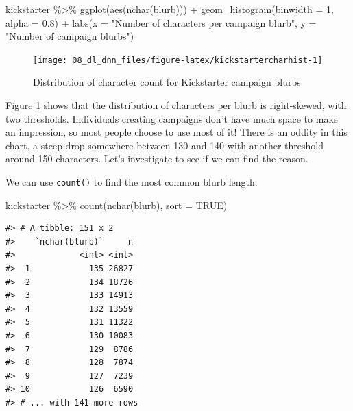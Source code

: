 \documentclass[
]{krantz}
\makeatletter
\newenvironment{Shaded}{\begin{snugshade}}{\end{snugshade}}
\newcommand{\AttributeTok}[1]{\textcolor[rgb]{0.77,0.63,0.00}{#1}}
\newcommand{\ConstantTok}[1]{\textcolor[rgb]{0.00,0.00,0.00}{#1}}
\newcommand{\DecValTok}[1]{\textcolor[rgb]{0.00,0.00,0.81}{#1}}
\newcommand{\FloatTok}[1]{\textcolor[rgb]{0.00,0.00,0.81}{#1}}
\newcommand{\FunctionTok}[1]{\textcolor[rgb]{0.00,0.00,0.00}{#1}}
\newcommand{\NormalTok}[1]{#1}
\newcommand{\SpecialCharTok}[1]{\textcolor[rgb]{0.00,0.00,0.00}{#1}}
\newcommand{\StringTok}[1]{\textcolor[rgb]{0.31,0.60,0.02}{#1}}
\newenvironment{kframe}{%
\medskip{}
\setlength{\fboxsep}{.8em}
 \def\at@end@of@kframe{}%
 \ifinner\ifhmode%
  \def\at@end@of@kframe{\end{minipage}}%
  \begin{minipage}{\columnwidth}%
 \fi\fi%
 \def\FrameCommand##1{\hskip\@totalleftmargin \hskip-\fboxsep
 \colorbox{shadecolor}{##1}\hskip-\fboxsep
     \hskip-\linewidth \hskip-\@totalleftmargin \hskip\columnwidth}%
 \MakeFramed {\advance\hsize-\width
   \@totalleftmargin\z@ \linewidth\hsize
   \@setminipage}}%
 {\par\unskip\endMakeFramed%
 \at@end@of@kframe}
\renewenvironment{Shaded}{\begin{kframe}}{\end{kframe}}
\makeatother
\begin{document}
\begin{Shaded}
\begin{Highlighting}[]
\NormalTok{kickstarter }\SpecialCharTok{\%\textgreater{}\%}
  \FunctionTok{ggplot}\NormalTok{(}\FunctionTok{aes}\NormalTok{(}\FunctionTok{nchar}\NormalTok{(blurb))) }\SpecialCharTok{+}
  \FunctionTok{geom\_histogram}\NormalTok{(}\AttributeTok{binwidth =} \DecValTok{1}\NormalTok{, }\AttributeTok{alpha =} \FloatTok{0.8}\NormalTok{) }\SpecialCharTok{+}
  \FunctionTok{labs}\NormalTok{(}\AttributeTok{x =} \StringTok{"Number of characters per campaign blurb"}\NormalTok{,}
       \AttributeTok{y =} \StringTok{"Number of campaign blurbs"}\NormalTok{)}
\end{Highlighting}
\end{Shaded}

\begin{figure}

{\centering \texttt{[image: 08\_dl\_dnn\_files/figure-latex/kickstartercharhist-1]} 

}

\caption{Distribution of character count for Kickstarter campaign blurbs}\label{fig:kickstartercharhist}
\end{figure}

Figure \ref{fig:kickstartercharhist} shows that the distribution of characters per blurb is right-skewed, with two thresholds. Individuals creating campaigns don't have much space to make an impression, so most people choose to use most of it! There is an oddity in this chart, a steep drop somewhere between 130 and 140 with another threshold around 150 characters. Let's investigate to see if we can find the reason.

We can use \texttt{count()} to find the most common blurb length.

\begin{Shaded}
\begin{Highlighting}[]
\NormalTok{kickstarter }\SpecialCharTok{\%\textgreater{}\%}
  \FunctionTok{count}\NormalTok{(}\FunctionTok{nchar}\NormalTok{(blurb), }\AttributeTok{sort =} \ConstantTok{TRUE}\NormalTok{)}
\end{Highlighting}
\end{Shaded}

\begin{verbatim}
#> # A tibble: 151 x 2
#>    `nchar(blurb)`     n
#>             <int> <int>
#>  1            135 26827
#>  2            134 18726
#>  3            133 14913
#>  4            132 13559
#>  5            131 11322
#>  6            130 10083
#>  7            129  8786
#>  8            128  7874
#>  9            127  7239
#> 10            126  6590
#> # ... with 141 more rows
\end{verbatim}
\end{document}
